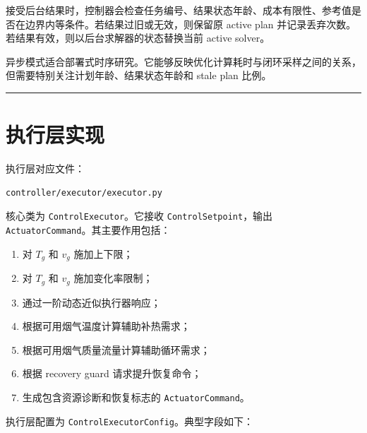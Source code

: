 \documentclass[UTF8,openany,zihao=-4,oneside]{ctexbook}
\providecommand{\tightlist}{\setlength{\itemsep}{0pt}\setlength{\parskip}{0pt}}
\providecommand{\passthrough}[1]{#1}
\newcommand{\manualdivider}{\par\vspace{0.6em}\noindent\textcolor{FGLine}{\rule{\linewidth}{0.7pt}}\vspace{0.6em}\par}
\begin{document}
接受后台结果时，控制器会检查任务编号、结果状态年龄、成本有限性、参考值是否在边界内等条件。若结果过旧或无效，则保留原 active plan 并记录丢弃次数。若结果有效，则以后台求解器的状态替换当前 active solver。

异步模式适合部署式时序研究。它能够反映优化计算耗时与闭环采样之间的关系，但需要特别关注计划年龄、结果状态年龄和 stale plan 比例。

\manualdivider

\section{执行层实现}\label{sec:executor-implementation}

执行层对应文件：

\begin{lstlisting}
controller/executor/executor.py
\end{lstlisting}

核心类为 \passthrough{\lstinline!ControlExecutor!}。它接收 \passthrough{\lstinline!ControlSetpoint!}，输出 \passthrough{\lstinline!ActuatorCommand!}。其主要作用包括：

\begin{enumerate}
\def\labelenumi{\arabic{enumi}.}
\tightlist
\item
  对 \(T_g\) 和 \(v_g\) 施加上下限；
\item
  对 \(T_g\) 和 \(v_g\) 施加变化率限制；
\item
  通过一阶动态近似执行器响应；
\item
  根据可用烟气温度计算辅助补热需求；
\item
  根据可用烟气质量流量计算辅助循环需求；
\item
  根据 recovery guard 请求提升恢复命令；
\item
  生成包含资源诊断和恢复标志的 \passthrough{\lstinline!ActuatorCommand!}。
\end{enumerate}

执行层配置为 \passthrough{\lstinline!ControlExecutorConfig!}。典型字段如下：
\end{document}
